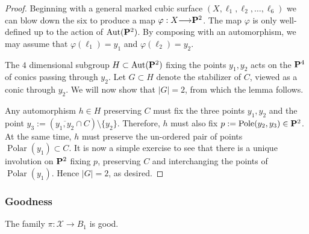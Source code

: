 \documentclass[12pt,reqno]{amsart}
\DeclareMathOperator{\Polar}{Polar}
\DeclareMathOperator{\Pole}{Pole}
\renewcommand{\to}{{\longrightarrow}}
\numberwithin{equation}{section}
\newcommand{\cX}{\mathcal{X}}
\begin{document}
  \begin{proof}
    Beginning with a general marked cubic surface
    $(X, \ell_{1}, \ell_2, \dots, \ell_{6})$ we can blow down the six
    to produce a map $\varphi: X \to \P^2$. The map $\varphi$ is only
    well-defined up to the action of $\Aut(\P^{2})$.  By composing
    with an automorphism, we may assume that
    $\varphi(\ell_{1}) = y_{1}$ and $\varphi(\ell_{2}) = y_{2}$.

    The $4$ dimensional subgroup $H \subset \Aut(\P^{2})$ fixing the
    points $y_{1}, y_{2}$ acts on the $\P^{4}$ of conics passing
    through $y_{2}$. Let $G \subset H$ denote the stabilizer of $C$,
    viewed as a conic through $y_{2}$.  We will now show that $|G|=2$,
    from which the lemma follows.

    Any automorphism $h \in H$ preserving $C$ must fix the three
    points $y_{1},y_{2}$ and the point
    $y_{3}:= (\overline{y_{1},y_{2}} \cap C) \setminus \{y_{2}\}.$
    Therefore, $h$ must also fix $p := \Pole(y_{2},y_{3}) \in \P^{2}$.
    At the same time, $h$ must preserve the un-ordered pair of points
    $\Polar(y_{1}) \subset C$. It is now a simple exercise to see that
    there is a unique involution on $\P^{2}$ fixing $p$, preserving
    $C$ and interchanging the points of $\Polar(y_{1})$. Hence
    $|G|=2$, as desired.
  \end{proof}




\subsubsection{Goodness}
\label{sec:goodness1}

\begin{proposition}
  \label{prop:B1good}
  The family $\pi: \cX \to B_1$ is good.
\end{proposition}
\end{document}
